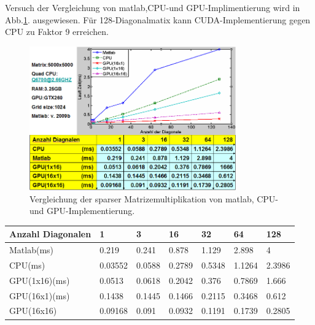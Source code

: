 

Versuch der Vergleichung von matlab,CPU-und GPU-Implimentierung wird in Abb.\ref{sparse_ergebnis}. ausgewiesen. Für 128-Diagonalmatix kann CUDA-Implementierung gegen CPU zu Faktor 9 erreichen.


\begin{figure}[htbp]
\includegraphics[width=3.5in]{../xby/pic//sparse_ergebnis}
\caption{Vergleichung der sparser Matrizemultiplikation von matlab, CPU-und GPU-Implementierung.}
\label{sparse_ergebnis}
\end{figure}


\begin{table}
\centering
\begin{tabular}{|p{46pt}p{20pt}p{20pt}p{20pt}p{20pt}p{20pt}p{20pt}|}
\toprule
Anzahl Diagonalen& 1& 3& 16& 32& 64 &128\\

\midrule
Matlab(ms)&			0.219&   0.241&   0.878&   1.129&   2.898& 4\\
CPU(ms)& 			0.03552&   0.0588& 	0.2789& 0.5348&  1.1264& 2.3986\\
GPU(1x16)(ms)& 0.0513&   0.0618&  0.2042&  0.376&  0.7869& 1.666\\
GPU(16x1)(ms)& 0.1438&	 0.1445&	0.1466&	0.2115&	 0.3468&	0.612\\

GPU(16x16) & 0.09168&	0.091&	0.0932&	0.1191&	0.1739&	0.2805\\
\bottomrule
\end{tabular}
\end{table}